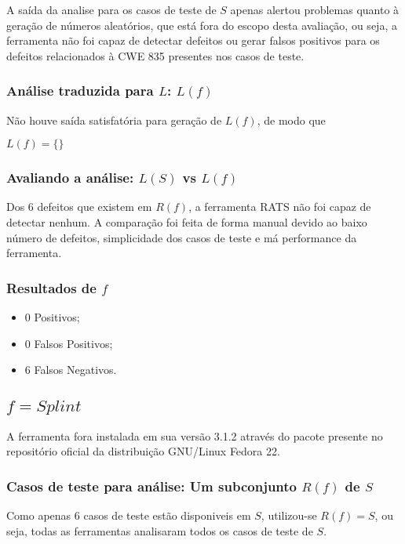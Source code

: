 A saída da analise para os casos de teste de $S$ apenas alertou problemas quanto à geração de números aleatórios, que está fora do escopo desta avaliação, ou seja, a ferramenta não foi capaz de detectar defeitos ou gerar falsos positivos para os defeitos relacionados à CWE 835 presentes nos casos de teste.

\subsubsection{Análise traduzida para $L$: $L(f)$}

Não houve saída satisfatória para geração de $L(f)$, de modo que 

$L(f) = \lbrace\rbrace$

\subsubsection{Avaliando a análise: $L(S)$ vs $L(f)$}

Dos 6 defeitos que existem em $R(f)$, a ferramenta RATS não foi capaz de detectar nenhum. A comparação foi feita de forma manual devido ao baixo número de defeitos, simplicidade dos casos de teste e má performance da ferramenta.

\subsubsection{Resultados de $f$}

\begin{itemize}
  \item 0 Positivos;
  \item 0 Falsos Positivos;
  \item 6 Falsos Negativos.
\end{itemize}

\subsection{$f = Splint$}

A ferramenta fora instalada em sua versão 3.1.2 através do pacote presente no repositório oficial da distribuição GNU/Linux Fedora 22.

\subsubsection{Casos de teste para análise: Um subconjunto $R(f)$ de $S$}

Como apenas 6 casos de teste estão disponiveis em $S$, utilizou-se $R(f) = S$, ou seja, todas as ferramentas analisaram todos os casos de teste de $S$.

